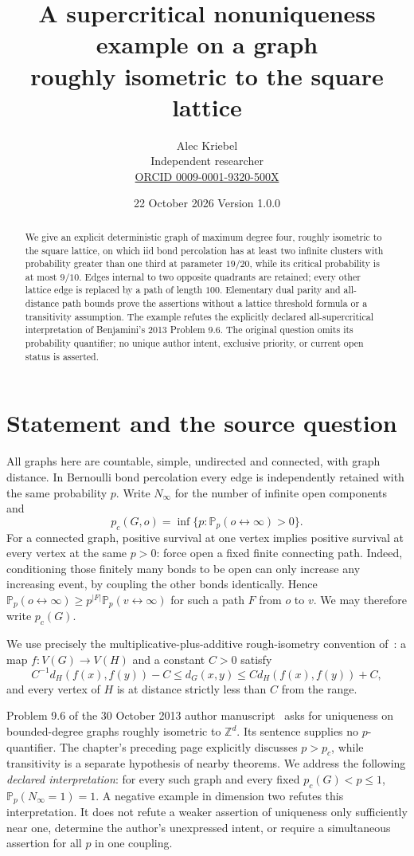 \documentclass[11pt]{article}
\title{A supercritical nonuniqueness example on a graph\\
roughly isometric to the square lattice}
\author{Alec Kriebel\\ \small Independent researcher\\
\small \href{https://orcid.org/0009-0001-9320-500X}{ORCID 0009-0001-9320-500X}}
\date{22 October 2026 \quad Version 1.0.0}
\theoremstyle{definition}
\newcommand{\PP}{\mathbb P}
\newcommand{\ZZ}{\mathbb Z}
\begin{document}
\maketitle
\begin{abstract}
We give an explicit deterministic graph of maximum degree four, roughly
isometric to the square lattice, on which iid bond percolation has at least
two infinite clusters with probability greater than one third at parameter
$19/20$, while its critical probability is at most $9/10$.
Edges internal to two opposite quadrants are retained; every other lattice
edge is replaced by a path of length $100$. Elementary dual parity and
all-distance path bounds prove the assertions without a lattice threshold
formula or a transitivity assumption. The example refutes the explicitly
declared all-supercritical interpretation of Benjamini's 2013 Problem 9.6.
The original question omits its probability quantifier; no unique author
intent, exclusive priority, or current open status is asserted.
\end{abstract}

\section{Statement and the source question}
All graphs here are countable, simple, undirected and connected, with graph
distance. In Bernoulli bond percolation every edge is independently retained
with the same probability $p$. Write $N_\infty$ for the number of infinite
open components and
\[
 p_c(G,o)=\inf\{p:\PP_p(o\leftrightarrow\infty)>0\}.
\]
For a connected graph, positive survival at one vertex implies positive survival
at every vertex at the same $p>0$: force open a fixed finite connecting path.
Indeed, conditioning those finitely many bonds to be open can only increase
any increasing event, by coupling the other bonds identically. Hence
$\PP_p(o\leftrightarrow\infty)\geq p^{|F|}\PP_p(v\leftrightarrow\infty)$
for such a path $F$ from $o$ to $v$. We may therefore write $p_c(G)$.

We use precisely the multiplicative-plus-additive rough-isometry convention
of~\cite[Definition 1.25, manuscript p.~9]{benjamini}: a map
$f:V(G)\to V(H)$ and a constant $C>0$ satisfy
\[
 C^{-1}d_H(f(x),f(y))-C\leq d_G(x,y)
 \leq C d_H(f(x),f(y))+C,
\]
and every vertex of $H$ is at distance strictly less than $C$ from the range.

Problem 9.6 of the 30 October 2013 author manuscript~\cite[p.~64]{benjamini}
asks for uniqueness on bounded-degree graphs roughly isometric to $\ZZ^d$.
Its sentence supplies no $p$-quantifier. The chapter's preceding page explicitly
discusses $p>p_c$, while transitivity is a separate hypothesis of nearby
theorems. We address the following \emph{declared interpretation}:
for every such graph and every fixed $p_c(G)<p\leq1$,
$\PP_p(N_\infty=1)=1$. A negative example in dimension two refutes this
interpretation. It does not refute a weaker assertion of uniqueness only
sufficiently near one, determine the author's unexpressed intent, or require
a simultaneous assertion for all $p$ in one coupling.
\end{document}
